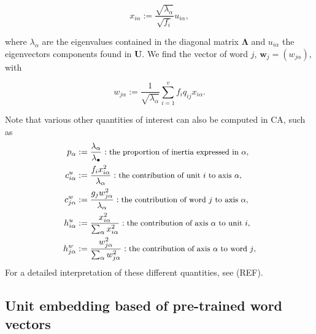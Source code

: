 \documentclass[
twocolumn,
]{ceurart}
\begin{document}
\begin{equation}
x_{i\alpha} := \frac{\sqrt{\lambda_\alpha}}{\sqrt{f_i}} u_{i \alpha},
\end{equation}

where $\lambda_\alpha$ are the eigenvalues contained in the diagonal matrix $\bm{\Lambda}$ and $u_{i \alpha}$ the eigenvectors components found in $\mathbf{U}$. We find the vector of word $j$, $\mathbf{w}_j = (w_{j\alpha})$, with 

\begin{equation}
w_{j\alpha} := \frac{1}{\sqrt{\lambda_\alpha}} \sum_{i=1}^v f_i q_{ij} x_{i \alpha}.
\end{equation}

Note that various other quantities of interest can also be computed in CA, such as 
\begin{align*}
p_\alpha &:= \frac{\lambda_\alpha}{\lambda_\bullet} :\text{\small the proportion of inertia expressed in $\alpha$,} \\
c^u_{i \alpha} &:= \frac{f_i x_{i\alpha}^2}{\lambda_\alpha} : \text{\small the contribution of unit $i$ to axis $\alpha$,} \\
c^w_{j \alpha} &:= \frac{g_j w_{j\alpha}^2}{\lambda_\alpha} : \text{\small the contribution of word $j$ to axis $\alpha$,} \\
h^u_{i \alpha} &:= \frac{x_{i\alpha}^2}{\sum_{\alpha} x_{i\alpha}^2} : \text{\small the contribution of  axis $\alpha$ to unit $i$,} \\
h^w_{j \alpha} &:= \frac{w_{j\alpha}^2}{\sum_{\alpha} w_{j\alpha}^2} : \text{\small the contribution of  axis $\alpha$ to word $j$,}
\end{align*}
For a detailed interpretation of these different quantities, see (REF). 

\subsection{Unit embedding based of pre-trained word vectors}
\label{wv_details}
\end{document}
